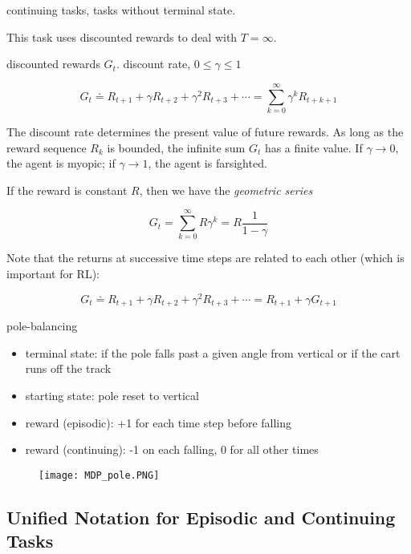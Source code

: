 \documentclass[lang=en,mode=geye,device=normal,color=blue,14pt]{elegantnote}
\DeclareMathOperator*{\1}{\mathbbm{1}}
\begin{document}
\begin{definition}
continuing tasks, tasks without terminal state.
\end{definition}

This task uses discounted rewards to deal with $T=\infty$.

\begin{definition}
discounted rewards $G_t$. discount rate, $0 \leq \gamma \leq 1$

$$ G_t \doteq R_{t+1} + \gamma R_{t+2} + \gamma^2 R_{t+3} + \cdots = \sum_{k=0}^{\infty} \gamma^k R_{t+k+1} $$
\end{definition}

The discount rate determines the present value of future rewards. As long as the reward sequence {$R_k$} is bounded, the infinite sum $G_t$ has a finite value.
If $\gamma \rightarrow 0$, the agent is myopic; if $\gamma \rightarrow 1$, the agent is farsighted.

If the reward is constant $R$, then we have the \textit{geometric series}

$$ G_t = \sum_{k=0}^{\infty} R\gamma^k = R\frac{1}{1-\gamma} $$

Note that the returns at successive time steps are related to each other (which is important for RL):

$$ G_t \doteq R_{t+1} + \gamma R_{t+2} + \gamma^2 R_{t+3} + \cdots = R_{t+1} + \gamma G_{t+1} $$

\begin{example} pole-balancing
\begin{itemize}
\item terminal state: if the pole falls past a given angle from vertical or if the cart runs off the track
\item starting state: pole reset to vertical
\item reward (episodic): +1 for each time step before falling
\item reward (continuing): -1 on each falling, 0 for all other times
\end{itemize}
\end{example}


\begin{figure}[!h]
  \texttt{[image: MDP\_pole.PNG]}
  \label{fig:MDP_pole}
\end{figure}



\subsection{Unified Notation for Episodic and Continuing Tasks}
\end{document}
